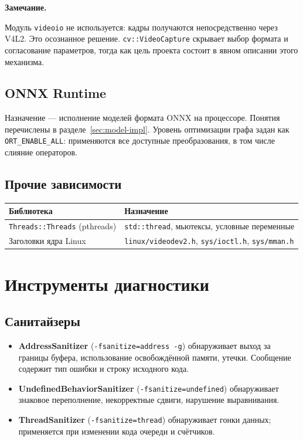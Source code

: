 \documentclass[11pt,a4paper]{article}
\theoremstyle{definition}
\theoremstyle{remark}
\newenvironment{note}
  {\par\medskip\noindent
   \begin{lrbox}{\notebox}%
   \begin{minipage}{0.93\linewidth}%
   \small\textbf{Замечание.}\par\vspace{1pt}\noindent\ignorespaces}
  {\end{minipage}%
   \end{lrbox}%
   \fboxsep=6pt\relax
   \colorbox{codebg}{\usebox{\notebox}}%
   \par\medskip}
\begin{document}
\begin{note}
Модуль \texttt{videoio} не используется: кадры получаются непосредственно
через V4L2. Это осознанное решение. \texttt{cv::VideoCapture} скрывает выбор
формата и согласование параметров, тогда как цель проекта состоит в явном
описании этого механизма.
\end{note}

\subsection{ONNX Runtime}

Назначение --- исполнение моделей формата ONNX на процессоре. Понятия
перечислены в разделе~\ref{sec:model-impl}. Уровень оптимизации графа задан
как \texttt{ORT\_ENABLE\_ALL}: применяются все доступные преобразования, в том
числе слияние операторов.

\subsection{Прочие зависимости}

\begin{center}
\begin{tabular}{ll}
\toprule
Библиотека & Назначение \\
\midrule
\texttt{Threads::Threads} (pthreads) & \texttt{std::thread}, мьютексы,
условные переменные \\
Заголовки ядра Linux & \texttt{linux/videodev2.h}, \texttt{sys/ioctl.h},
\texttt{sys/mman.h} \\
\bottomrule
\end{tabular}
\end{center}

\section{Инструменты диагностики}
\label{sec:tools}

\subsection{Санитайзеры}

\begin{itemize}
  \item \textbf{AddressSanitizer} (\texttt{-fsanitize=address -g}) обнаруживает
        выход за границы буфера, использование освобождённой памяти,
        утечки. Сообщение содержит тип ошибки и строку исходного кода.
  \item \textbf{UndefinedBehaviorSanitizer} (\texttt{-fsanitize=undefined})
        обнаруживает знаковое переполнение, некорректные сдвиги, нарушение
        выравнивания.
  \item \textbf{ThreadSanitizer} (\texttt{-fsanitize=thread}) обнаруживает
        гонки данных; применяется при изменении кода очереди и счётчиков.
\end{itemize}
\end{document}
